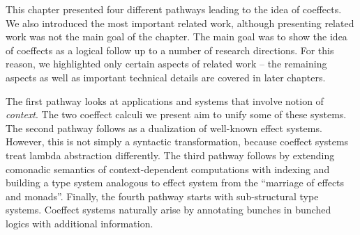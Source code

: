 This chapter presented four different pathways leading to the idea of coeffects. We also 
introduced the most important related work, although presenting related work was not the
main goal of the chapter. The main goal was to show the idea of coeffects as a logical follow up
to a number of research directions. For this reason, we highlighted only certain aspects of 
related work -- the remaining aspects as well as important technical details are covered 
in later chapters.

The first pathway looks at applications and systems that involve notion of \emph{context}.
The two coeffect calculi we present aim to unify some of these systems. The second pathway
follows as a dualization of well-known effect systems. However, this is not simply a syntactic
transformation, because coeffect systems treat lambda abstraction differently. The third 
pathway follows by extending comonadic semantics of context-dependent computations with 
indexing and building a type system analogous to effect system from the ``marriage of effects
and monads''. Finally, the fourth pathway starts with sub-structural type systems. Coeffect
systems naturally arise by annotating bunches in bunched logics with additional information.


% 
